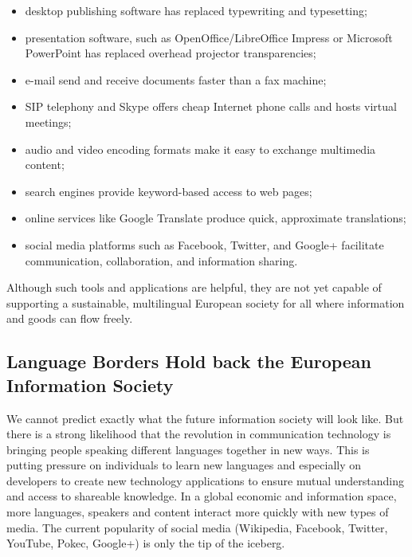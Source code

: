 \begin{multicols}{2}
\begin{itemize}
\item desktop publishing software has replaced typewriting and typesetting;
\item presentation software, such as OpenOffice/LibreOffice Impress or Microsoft PowerPoint has replaced overhead projector transparencies;
\item e-mail send and receive documents faster than a fax machine;
\item SIP telephony and Skype offers cheap Internet phone calls and hosts virtual meetings;
\item audio and video encoding formats make it easy to exchange multimedia content;
\item search engines provide keyword-based access to web pages;
\item online services like Google Translate produce quick, approximate translations;
\item social media platforms such as Facebook, Twitter, and Google+ facilitate communication, collaboration, and information sharing.
\end{itemize}

Although such tools and applications are helpful, they are not yet capable of supporting a sustainable, multilingual European society for all where information and goods can flow freely.

\subsection{Language Borders Hold back the European Information Society}

We cannot predict exactly what the future information society will look like. 
But there is a strong likelihood that the revolution in communication technology is bringing people speaking different languages together in new ways. This is putting pressure on individuals to learn new languages and especially on developers to create new technology applications to ensure mutual understanding and access to shareable knowledge. In a global economic and information space, more languages, speakers and content interact more quickly with new types of media. The current popularity of social media (Wikipedia, Facebook, Twitter, YouTube, Pokec, Google+) is only the tip of the iceberg.



\end{multicols}
